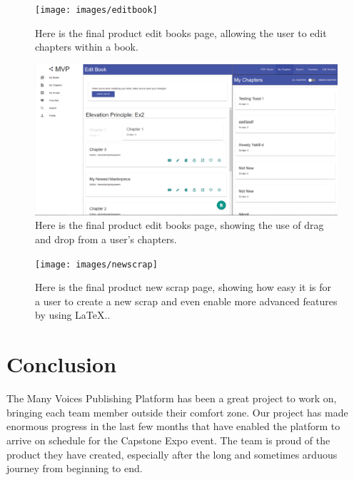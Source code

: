 \documentclass[onecolumn, draftclsnofoot,10pt, compsoc]{IEEEtran}
\begin{document}
\begin{figure}[ht!]
	\centering
	\texttt{[image: images/editbook]}
	\caption{Here is the final product edit books page, allowing the user to edit chapters within a book.}
\end{figure}

\begin{figure}[ht!]
	\centering
	\includegraphics[width=12cm]{images/editbook_drag}
	\caption{Here is the final product edit books page, showing the use of drag and drop from a user's chapters.}
\end{figure}

\begin{figure}[ht!]
	\centering
	\texttt{[image: images/newscrap]}
	\caption{Here is the final product new scrap page, showing how easy it is for a user to create a new scrap and even enable more advanced features by using LaTeX..}
\end{figure}

\clearpage
\newpage
\section{Conclusion}
\noindent The Many Voices Publishing Platform has been a great project to work on, bringing each team member outside their comfort zone. Our project has made enormous progress in the last few months that have enabled the platform to arrive on schedule for the Capstone Expo event. The team is proud of the product they have created, especially after the long and sometimes arduous journey from beginning to end.
\end{document}
